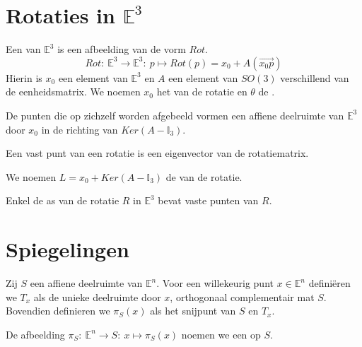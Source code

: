 \documentclass[main.tex]{subfiles}
\begin{document}
\section{Rotaties in $\mathbb{E}^{3}$}
\label{sec:roties-in-e3}

\begin{de}
  \examen
  Een  van $\mathbb{E}^{3}$ is een afbeelding van de vorm $Rot$.
  \[ Rot:\ \mathbb{E}^{3} \rightarrow \mathbb{E}^{3}:\ p \mapsto Rot(p) = x_{0} + A(\overrightarrow{x_{0}p}) \]
  Hierin is $x_{0}$ een element van $\mathbb{E}^{3}$ en $A$ een element van $SO(3)$ verschillend van de eenheidsmatrix.
  We noemen $x_{0}$ het  van de rotatie en $\theta$ de .
\end{de}


\begin{st}
  De punten die op zichzelf worden afgebeeld vormen een affiene deelruimte van $\mathbb{E}^{3}$ door $x_{0}$ in de richting van $Ker(A-\mathbb{I}_{3})$.
\end{st}

\begin{st}
  Een vast punt van een rotatie is een eigenvector van de rotatiematrix.
\end{st}

\begin{de}
  We noemen $L = x_{0} + Ker(A-\mathbb{I}_{3})$ de  van de rotatie.
\end{de}

\begin{ei}
  Enkel de as van de rotatie $R$ in $\mathbb{E}^{3}$ bevat vaste punten van $R$.
\end{ei}

\section{Spiegelingen}
\label{sec:spiegelingen}

\begin{de}
  \examen
  Zij $S$ een affiene deelruimte van $\mathbb{E}^{n}$.
  Voor een willekeurig punt $x\in \mathbb{E}^{n}$ defini\"eren we $T_{x}$ als de unieke deelruimte door $x$, orthogonaal complementair mat $S$.
  Bovendien definieren we $\pi_{S}(x)$ als het snijpunt van $S$ en $T_{x}$.
\end{de}
 
\begin{de}
  De afbeelding $\pi_{S}:\ \mathbb{E}^{n} \rightarrow S:\ x \mapsto \pi_{S}(x)$ noemen we een  op $S$.
\end{de}
\end{document}
